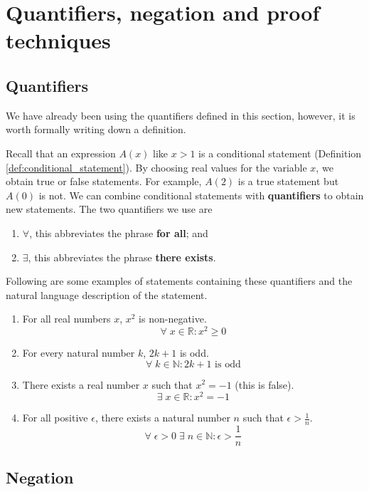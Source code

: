 \chapter{Quantifiers, negation and proof techniques}

\section{Quantifiers}

We have already been using the quantifiers defined in this section, however, it is worth formally writing down a definition.

Recall that an expression $A(x)$ like $x>1$ is a conditional statement (Definition \ref{def:conditional_statement}). By choosing real values for the variable $x$, we obtain true or false statements. For example, $A(2)$ is a true statement but $A(0)$ is not. We can combine conditional statements with \textbf{quantifiers} to obtain new statements. The two quantifiers we use are
\begin{enumerate}
    \item $\forall$, this abbreviates the phrase \textbf{for all}; and
    \item $\exists$, this abbreviates the phrase \textbf{there exists}.
\end{enumerate}

\begin{example}
    Following are some examples of statements containing these quantifiers and the natural language description of the statement.
    \begin{enumerate}
        \item For all real numbers $x$, $x^2$ is non-negative. \[\forall\;x\in\mathbb R:x^2\geq 0\]
        \item For every natural number $k$, $2k+1$ is odd. \[\forall\;k\in\mathbb N:2k+1\text{ is odd}\]
        \item There exists a real number $x$ such that $x^2=-1$ (this is false). \[\exists\; x\in\mathbb R: x^2=-1\]
        \item For all positive $\epsilon$, there exists a natural number $n$ such that $\epsilon>\frac1n$. \[\forall\;\epsilon>0\;\exists\;n\in\mathbb N:\epsilon>\frac1n\]
    \end{enumerate}
\end{example}

\section{Negation}

